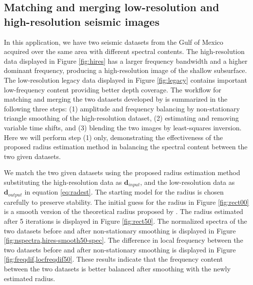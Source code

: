 



\subsection{Matching and merging low-resolution and high-resolution seismic images}
In this application, we have two seismic datasets from the Gulf of Mexico acquired over the same area with different spectral contents. 
The high-resolution data displayed in Figure \ref{fig:hires} has a larger frequency bandwidth and a higher dominant frequency, producing a high-resolution image of the shallow subsurface. The low-resolution legacy data displayed in Figure \ref{fig:legacy} contains important low-frequency content providing better depth coverage. The workflow for matching and merging the two datasets developed by \cite{greerfomel2018} is summarized in the following three steps: (1) amplitude and frequency balancing by non-stationary triangle smoothing of the high-resolution dataset, (2) estimating and removing variable time shifts, and (3) blending the two images by least-squares inversion. Here we will perform step (1) only, demonstrating the effectiveness of the proposed radius estimation method in balancing the spectral content between the two given datasets. 

We match the two given datasets using the proposed radius estimation method substituting the high-resolution data as $\mathbf{d}_{input}$, and the low-resolution data as $\mathbf{d}_{output}$ in equation \ref{eq:radest}. 
The starting model for the radius is chosen carefully to preserve stability. The initial guess for the radius in Figure \ref{fig:rect00} is a smooth version of the theoretical radius proposed by \cite{greerfomel2018}. The radius estimated after 5 iterations is displayed in Figure \ref{fig:rect50}. 
The normalized spectra of the two datasets before and after non-stationary smoothing is displayed in Figure \ref{fig:nspectra,hires-smooth50-spec}. The difference in local frequency between the two datasets before and after non-stationary smoothing is displayed in Figure \ref{fig:freqdif,locfreqdif50}. 
These results indicate that the frequency content between the two datasets is better balanced after smoothing with the newly estimated radius.


